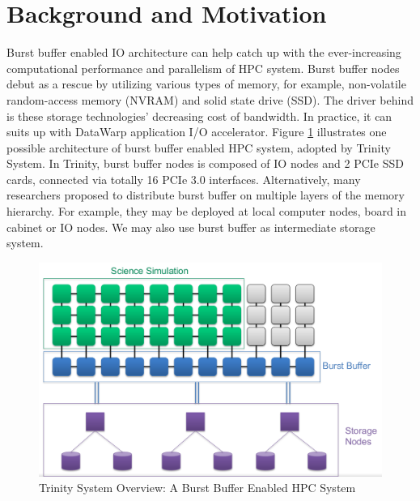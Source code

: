 \section{Background and Motivation}
\label{Sec:Background and Motivation}
Burst buffer enabled IO architecture can help catch up with
the ever-increasing computational performance and parallelism of HPC system.
Burst buffer nodes debut as a rescue by utilizing various types of memory,
for example, non-volatile random-access memory (NVRAM) and solid state drive (SSD).
The driver behind is these storage technologies' decreasing cost of bandwidth.
In practice, it can suits up with DataWarp application I/O accelerator\cite{DataWarp}.
Figure \ref{Fig:BBArchitecture} illustrates one possible architecture of
burst buffer enabled HPC system, adopted by Trinity System\cite{TrinitySystem}.
In Trinity, burst buffer nodes is composed of IO nodes and 2 PCIe SSD cards,
connected via totally 16 PCIe 3.0 interfaces.
Alternatively, many researchers proposed to distribute burst buffer 
on multiple layers of the memory hierarchy\cite{Romanus:CORR:15}.
For example, they may be deployed at local computer nodes, board in cabinet or IO nodes.
We may also use burst buffer as intermediate storage system.

\begin{figure}[!t]
        \centering
        \includegraphics[width=6.6in]{BBArchitecture}
        \caption{Trinity System Overview: A Burst Buffer Enabled HPC System}
        \label{Fig:BBArchitecture}
\end{figure}

